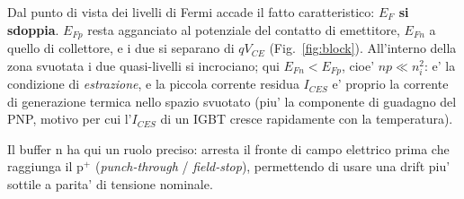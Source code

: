 \documentclass[11pt,a4paper]{article}
\begin{document}
Dal punto di vista dei livelli di Fermi accade il fatto caratteristico:
\textbf{$E_F$ si sdoppia}. $E_{Fp}$ resta agganciato al potenziale del contatto
di emettitore, $E_{Fn}$ a quello di collettore, e i due si separano di
$qV_{CE}$ (Fig.~\ref{fig:block}). All'interno della zona svuotata i due
quasi-livelli si incrociano; qui $E_{Fn}<E_{Fp}$, cioe' $np \ll n_i^2$: e' la
condizione di \emph{estrazione}, e la piccola corrente residua
$I_{CES}$ e' proprio la corrente di generazione termica nello spazio svuotato
(piu' la componente di guadagno del PNP, motivo per cui l'$I_{CES}$ di un IGBT
cresce rapidamente con la temperatura).

Il buffer $\mathrm{n}$ ha qui un ruolo preciso: arresta il fronte di campo
elettrico prima che raggiunga il $\mathrm{p^{+}}$ (\emph{punch-through} /
\emph{field-stop}), permettendo di usare una drift piu' sottile a parita' di
tensione nominale.
\end{document}
